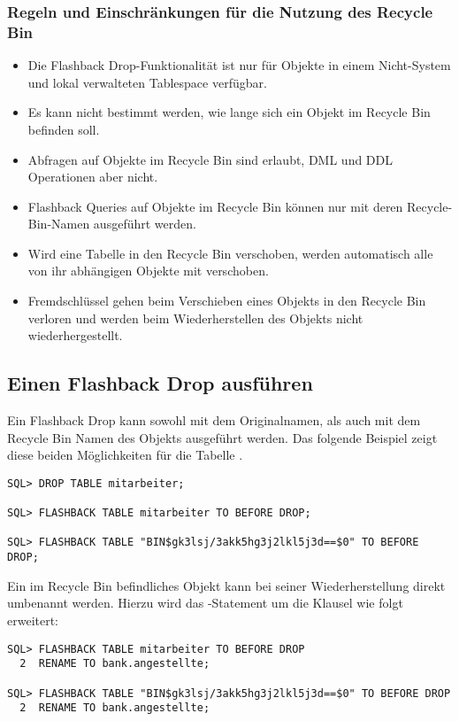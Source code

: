         \subsubsection{Regeln und Einschränkungen für die Nutzung des Recycle Bin}
          \begin{itemize}
            \item Die Flashback Drop-Funktionalität ist nur für Objekte in einem Nicht-System und lokal verwalteten Tablespace verfügbar.
            \item Es kann nicht bestimmt werden, wie lange sich ein Objekt im Recycle Bin befinden soll.
            \item Abfragen auf Objekte im Recycle Bin sind erlaubt, DML und DDL Operationen aber nicht.
            \item Flashback Queries auf Objekte im Recycle Bin können nur mit deren Recycle-Bin-Namen ausgeführt werden.
            \item Wird eine Tabelle in den Recycle Bin verschoben, werden automatisch alle von ihr abhängigen Objekte mit verschoben.
            \item Fremdschlüssel gehen beim Verschieben eines Objekts in den Recycle Bin verloren und werden beim Wiederherstellen des Objekts nicht wiederhergestellt.
          \end{itemize}
      \subsection{Einen Flashback Drop ausführen}
        Ein Flashback Drop kann sowohl mit dem Originalnamen, als auch mit dem Recycle Bin Namen des Objekts ausgeführt werden. Das folgende Beispiel zeigt diese beiden Möglichkeiten für die Tabelle .
\clearpage
        \begin{lstlisting}[caption={Ausführen eines Flashback Drop},label=admin1723,language=oracle_sql]
SQL> DROP TABLE mitarbeiter;

SQL> FLASHBACK TABLE mitarbeiter TO BEFORE DROP;

SQL> FLASHBACK TABLE "BIN$gk3lsj/3akk5hg3j2lkl5j3d==$0" TO BEFORE DROP;
        \end{lstlisting}
        Ein im Recycle Bin befindliches Objekt kann bei seiner Wiederherstellung direkt umbenannt werden. Hierzu wird das -Statement um die Klausel  wie folgt erweitert:
        \begin{lstlisting}[caption={Ausführen eines Flashback Drop mit gleichzeitiger Umbenennung},label=admin1724,language=oracle_sql]
SQL> FLASHBACK TABLE mitarbeiter TO BEFORE DROP
  2  RENAME TO bank.angestellte;

SQL> FLASHBACK TABLE "BIN$gk3lsj/3akk5hg3j2lkl5j3d==$0" TO BEFORE DROP
  2  RENAME TO bank.angestellte;
        \end{lstlisting}
